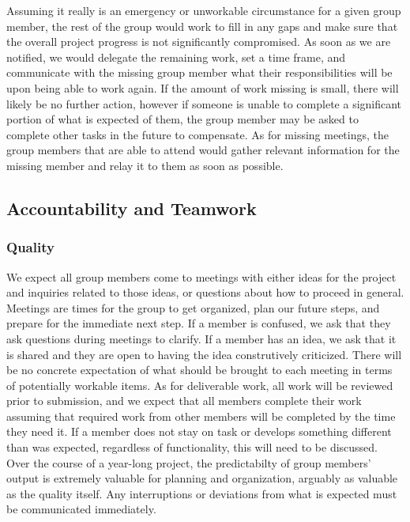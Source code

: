 \documentclass{article}
\begin{document}
Assuming it really is an emergency or unworkable circumstance for a given group member, the rest of the group would work to fill in any gaps and make sure that the overall project progress is not significantly compromised. As soon as we are notified, we would delegate the remaining work, set a time frame, and communicate with the missing group member what their responsibilities will be upon being able to work again. If the amount of work missing is small, there will likely be no further action, however if someone is unable to complete a significant portion of what is expected of them, the group member may be asked to complete other tasks in the future to compensate. As for missing meetings, the group members that are able to attend would gather relevant information for the missing member and relay it to them as soon as possible. 

\subsection*{Accountability and Teamwork}

\subsubsection*{Quality} 

We expect all group members come to meetings with either ideas for the project and inquiries related to those ideas, or questions about how to proceed in general. Meetings are times for the group to get organized, plan our future steps, and prepare for the immediate next step. If a member is confused, we ask that they ask questions during meetings to clarify. If a member has an idea, we ask that it is shared and they are open to having the idea construtively criticized. There will be no concrete expectation of what should be brought to each meeting in terms of potentially workable items. As for deliverable work, all work will be reviewed prior to submission, and we expect that all members complete their work assuming that required work from other members will be completed by the time they need it. If a member does not stay on task or develops something different than was expected, regardless of functionality, this will need to be discussed. Over the course of a year-long project, the predictabilty of group members' output is extremely valuable for planning and organization, arguably as valuable as the quality itself. Any interruptions or deviations from what is expected must be communicated immediately.
\end{document}
